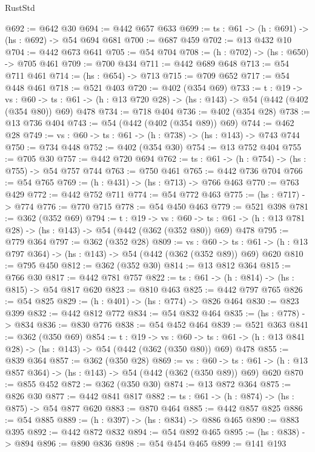 \begin{lexlean}{RustStd}
\begin{coremodule}
@692 := @642 @30
@694 := @442 @657 @633
@699 := {ts : @61} -> (h : @691) -> (hs : @692) -> @54 @694 @681
@700 := @687 @459
@702 := @13 @432 @10
@704 := @442 @673 @641
@705 := @54 @704
@708 := (h : @702) -> (hs : @650) -> @705 @461
@709 := @700 @434
@711 := @442 @689 @648
@713 := @54 @711 @461
@714 := (hs : @654) -> @713
@715 := @709 @652
@717 := @54 @448 @461
@718 := @521 @403
@720 := @402 (@354 @69)
@733 := {t : @19} ->
  {vs : @60} ->
  {ts : @61} -> (h : @13 @720 @28) -> (hs : @143) -> @54 (@442 (@402 (@354 @80)) @69) @478
@734 := @718 @404
@736 := @402 (@354 @28)
@738 := @13 @736 @404
@743 := @54 (@442 (@402 (@354 @89)) @69)
@744 := @462 @28
@749 := {vs : @60} -> {ts : @61} -> (h : @738) -> (hs : @143) -> @743 @744
@750 := @734 @448
@752 := @402 (@354 @30)
@754 := @13 @752 @404
@755 := @705 @30
@757 := @442 @720 @694
@762 := {ts : @61} -> (h : @754) -> (hs : @755) -> @54 @757 @744
@763 := @750 @461
@765 := @442 @736 @704
@766 := @54 @765
@769 := (h : @431) -> (hs : @713) -> @766 @463
@770 := @763 @429
@772 := @442 @752 @711
@774 := @54 @772 @463
@775 := (hs : @717) -> @774
@776 := @770 @715
@778 := @54 @450 @463
@779 := @521 @398
@781 := @362 (@352 @69)
@794 := {t : @19} ->
  {vs : @60} ->
  {ts : @61} -> (h : @13 @781 @28) -> (hs : @143) -> @54 (@442 (@362 (@352 @80)) @69) @478
@795 := @779 @364
@797 := @362 (@352 @28)
@809 := {vs : @60} ->
  {ts : @61} -> (h : @13 @797 @364) -> (hs : @143) -> @54 (@442 (@362 (@352 @89)) @69) @620
@810 := @795 @450
@812 := @362 (@352 @30)
@814 := @13 @812 @364
@815 := @766 @30
@817 := @442 @781 @757
@822 := {ts : @61} -> (h : @814) -> (hs : @815) -> @54 @817 @620
@823 := @810 @463
@825 := @442 @797 @765
@826 := @54 @825
@829 := (h : @401) -> (hs : @774) -> @826 @464
@830 := @823 @399
@832 := @442 @812 @772
@834 := @54 @832 @464
@835 := (hs : @778) -> @834
@836 := @830 @776
@838 := @54 @452 @464
@839 := @521 @363
@841 := @362 (@350 @69)
@854 := {t : @19} ->
  {vs : @60} ->
  {ts : @61} -> (h : @13 @841 @28) -> (hs : @143) -> @54 (@442 (@362 (@350 @80)) @69) @478
@855 := @839 @364
@857 := @362 (@350 @28)
@869 := {vs : @60} ->
  {ts : @61} -> (h : @13 @857 @364) -> (hs : @143) -> @54 (@442 (@362 (@350 @89)) @69) @620
@870 := @855 @452
@872 := @362 (@350 @30)
@874 := @13 @872 @364
@875 := @826 @30
@877 := @442 @841 @817
@882 := {ts : @61} -> (h : @874) -> (hs : @875) -> @54 @877 @620
@883 := @870 @464
@885 := @442 @857 @825
@886 := @54 @885
@889 := (h : @397) -> (hs : @834) -> @886 @465
@890 := @883 @395
@892 := @442 @872 @832
@894 := @54 @892 @465
@895 := (hs : @838) -> @894
@896 := @890 @836
@898 := @54 @454 @465
@899 := @141 @193

\end{coremodule}
\end{lexlean}
